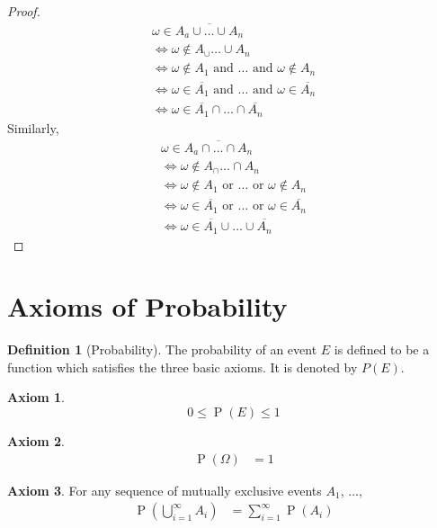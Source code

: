 \documentclass[titlepage, fleqn, a4paper, 12pt, twoside]{article}
\theoremstyle{definition}
\newtheorem{definition}{Definition}
\theoremstyle{theorem}
\newtheorem{axiom}{Axiom}
\DeclareMathOperator{\prob}{\mathrm{P}}
\begin{document}
\begin{proof}
	\begin{gather*}
		\omega \in \overline{A_a \cup \dots \cup A_n}\\
		\iff \omega \notin A_ \cup \dots \cup A_n\\
		\iff \omega \notin A_1 \text{ and } \dots \text{ and } \omega \notin A_n\\
		\iff \omega \in \overline{A_1} \text{ and } \dots \text{ and } \omega \in \overline{A_n}\\
		\iff \omega \in \overline{A_1} \cap \dots \cap \overline{A_n}
	\end{gather*}
	Similarly,
	\begin{gather*}
		\omega \in \overline{A_a \cap \dots \cap A_n}\\
		\iff \omega \notin A_ \cap \dots \cap A_n\\
		\iff \omega \notin A_1 \text{ or } \dots \text{ or } \omega \notin A_n\\
		\iff \omega \in \overline{A_1} \text{ or } \dots \text{ or } \omega \in \overline{A_n}\\
		\iff \omega \in \overline{A_1} \cup \dots \cup \overline{A_n}
	\end{gather*}
\end{proof}

\section{Axioms of Probability}

\begin{definition}[Probability]
	The probability of an event $E$ is defined to be a function which satisfies the three basic axioms.
	It is denoted by $P(E)$.
	\begin{axiom}
		\begin{equation*}
			0 \le \prob(E) \le 1
		\end{equation*}
	\end{axiom}
	
	\begin{axiom}
		\begin{align*}
			\prob(\Omega) & = 1
		\end{align*}
	\end{axiom}
	
	\begin{axiom}
		For any sequence of mutually exclusive events $A_1$, $\dots$,
		\begin{align*}
			\prob\left( \bigcup\limits_{i = 1}^{\infty} A_i \right) & = \sum\limits_{i = 1}^{\infty} \prob(A_i)
		\end{align*}
	\end{axiom}
\end{definition}
\end{document}
